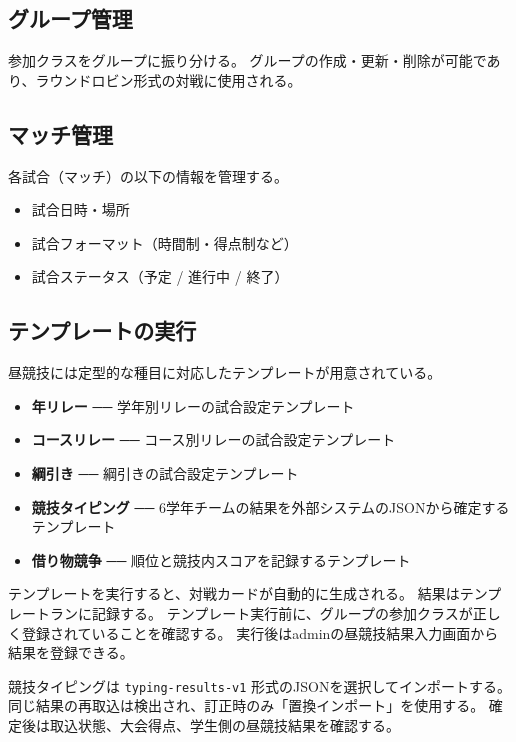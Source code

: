 \documentclass[12pt]{ltjsarticle}
\newcommand{\code}[1]{\colorbox{gray!20}{\texttt{#1}}}
\begin{document}
\subsection{グループ管理}

参加クラスをグループに振り分ける。
グループの作成・更新・削除が可能であり、ラウンドロビン形式の対戦に使用される。

\subsection{マッチ管理}

各試合（マッチ）の以下の情報を管理する。

\begin{itemize}
  \item 試合日時・場所
  \item 試合フォーマット（時間制・得点制など）
  \item 試合ステータス（予定 / 進行中 / 終了）
\end{itemize}

\subsection{テンプレートの実行}

昼競技には定型的な種目に対応したテンプレートが用意されている。

\begin{itemize}
  \item \textbf{年リレー} ── 学年別リレーの試合設定テンプレート
  \item \textbf{コースリレー} ── コース別リレーの試合設定テンプレート
  \item \textbf{綱引き} ── 綱引きの試合設定テンプレート
  \item \textbf{競技タイピング} ── 6学年チームの結果を外部システムのJSONから確定するテンプレート
  \item \textbf{借り物競争} ── 順位と競技内スコアを記録するテンプレート
\end{itemize}

テンプレートを実行すると、対戦カードが自動的に生成される。
結果はテンプレートランに記録する。
テンプレート実行前に、グループの参加クラスが正しく登録されていることを確認する。
実行後はadminの昼競技結果入力画面から結果を登録できる。

競技タイピングは \code{typing-results-v1} 形式のJSONを選択してインポートする。
同じ結果の再取込は検出され、訂正時のみ「置換インポート」を使用する。
確定後は取込状態、大会得点、学生側の昼競技結果を確認する。
\end{document}
